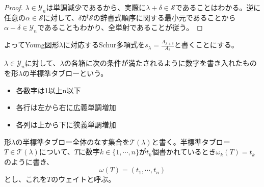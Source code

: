 \documentclass{ltjsreport}
\begin{document}
\begin{proof}
    $\lambda\in\mathcal{Y}_n$は単調減少であるから、実際に$\lambda+\delta\in\mathcal{S}$であることはわかる。逆に任意の$\alpha\in\mathcal{S}$に対して、$\delta$が$\mathcal{S}$の辞書式順序に関する最小元であることから$\alpha-\delta\in\mathcal{Y}_n$であることもわかり、全単射であることが従う。
\end{proof}

よってYoung図形$\lambda$に対応するSchur多項式を$s_\lambda=\frac{A_{\lambda+\delta}}{A_\delta}$と書くことにする。

\begin{defin}
    $\lambda\in\mathcal{Y}_n$に対して、$\lambda$の各箱に次の条件が満たされるように数字を書き入れたものを形$\lambda$の半標準タブローという。
    \begin{itemize}
        \item 各数字は1以上n以下
        \item 各行は左から右に広義単調増加
        \item 各列は上から下に狭義単調増加
    \end{itemize}
    形$\lambda$の半標準タブロー全体のなす集合を$\mathcal{T}(\lambda)$と書く。半標準タブロー$T\in\mathcal{T}(\lambda)$について、$T$に数字$k\in\{1,\cdots,n\}$が$t_k$個書かれているとき$\omega_k(T)=t_k$のように書き、
    \[
    \omega(T)=(t_1,\cdots,t_n)
    \]
    とし、これを$T$のウェイトと呼ぶ。
\end{defin}
\end{document}
